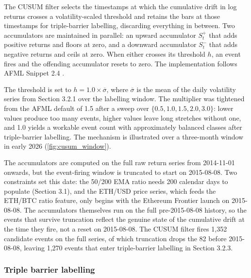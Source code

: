 \documentclass[12pt,a4paper,oneside]{article}
\begin{document}
The CUSUM filter selects the timestamps at which the cumulative drift in log returns crosses a volatility-scaled threshold and retains the bars at those timestamps for triple-barrier labelling, discarding everything in between. Two accumulators are maintained in parallel: an upward accumulator $S^+_t$ that adds positive returns and floors at zero, and a downward accumulator $S^-_t$ that adds negative returns and ceils at zero. When either crosses its threshold $h$, an event fires and the offending accumulator resets to zero. The implementation follows AFML Snippet 2.4 \citep{lopez_de_prado_2018}.

The threshold is set to $h = 1.0 \times \overline{\sigma}$, where $\overline{\sigma}$ is the mean of the daily volatility series from Section 3.2.1 over the labelling window. The multiplier was tightened from the AFML default of 1.5 after a sweep over $\{0.5, 1.0, 1.5, 2.0, 3.0\}$: lower values produce too many events, higher values leave long stretches without one, and 1.0 yields a workable event count with approximately balanced classes after triple-barrier labelling. The mechanism is illustrated over a three-month window in early 2026 \label{ref:cusum_call}(\autoref{fig:cusum_window}).

The accumulators are computed on the full raw return series from 2014-11-01 onwards, but the event-firing window is truncated to start on 2015-08-08. Two constraints set this date: the 50/200 EMA ratio needs 200 calendar days to populate (Section 3.1), and the ETH/USD price series, which feeds the ETH/BTC ratio feature, only begins with the Ethereum Frontier launch on 2015-08-08. The accumulators themselves run on the full pre-2015-08-08 history, so the events that survive truncation reflect the genuine state of the cumulative drift at the time they fire, not a reset on 2015-08-08. The CUSUM filter fires 1,352 candidate events on the full series, of which truncation drops the 82 before 2015-08-08, leaving 1,270 events that enter triple-barrier labelling in Section 3.2.3.


\subsubsection{Triple barrier labelling}\label{subsubsec:tbl}
\end{document}
